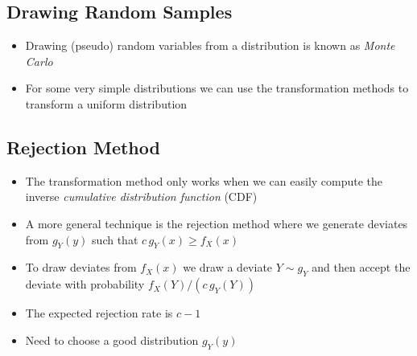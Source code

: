 
\begin{slide}
\section[-2]{Drawing Random Samples}

\pb
\begin{itemize}
\item Drawing (pseudo) random variables from a distribution is known
  as \emph{Monte Carlo}\pauseh
\item For some very simple distributions we can use the transformation
  methods to transform a uniform distribution\pauseh
\end{itemize}
\begin{center}
  \pause
\end{center}

\end{slide}


\begin{slide}
\section{Rejection Method}

\begin{PauseHighLight}
  \begin{itemize}
  \item The transformation method only works when we can easily compute
    the inverse \textit{cumulative distribution function} (CDF)\pause
  \item A more general technique is the rejection method where we
    generate deviates from $g_Y(y)$ such that $c\,g_Y(x)\geq f_X(x)$\pause
  \item To draw deviates from $f_X(x)$ we draw a deviate $Y\sim g_Y$ and
    then accept the deviate with probability $f_X(Y)/(c\,g_Y(Y))$\pause
  \item The expected rejection rate is $c-1$\pause
  \item Need to choose a good distribution $g_Y(y)$\pause
  \end{itemize}
\end{PauseHighLight}

\end{slide}

